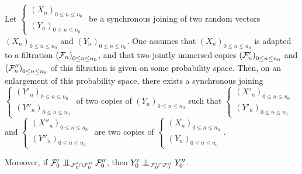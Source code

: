 \documentclass[12pt,a4paper]{article}
\begin{document}
\begin{lemma}\label{lemma:quadricoimm}
Let 
$\left\{\begin{smallmatrix} {(X_n)}_{0 \leq n \leq n_0} \\ 
{(Y_n)}_{0 \leq n \leq n_0}
\end{smallmatrix}\right.$  
be a synchronous joining of two random vectors 
${(X_n)}_{0 \leq n \leq n_0}$ and ${(Y_n)}_{0 \leq n \leq n_0}$. 
One assumes that ${(X_n)}_{0 \leq n \leq n_0}$ 
is adapted to a filtration ${(\mathcal{F}_n)}_{0 \leq n \leq n_0}$, 
and that two jointly immersed copies ${(\mathcal{F}'_n)}_{0 \leq n \leq n_0}$ 
and ${(\mathcal{F}''_n)}_{0 \leq n \leq n_0}$ of this filtration 
is given on some probability space.
Then, on an enlargement of this probability space, there 
exists a synchronous joining 
$\left\{\begin{smallmatrix} {(Y'_n)}_{0 \leq n \leq n_0} \\ 
{(Y''_n)}_{0 \leq n \leq n_0}
\end{smallmatrix}\right.$
of two copies of ${(Y_n)}_{0 \leq n \leq n_0}$ 
such that  
$\left\{\begin{smallmatrix} {(X'_n)}_{0 \leq n \leq n_0} \\ 
{(Y'_n)}_{0 \leq n \leq n_0}
\end{smallmatrix}\right.$ and 
$\left\{\begin{smallmatrix} {(X''_n)}_{0 \leq n \leq n_0} \\ 
{(Y''_n)}_{0 \leq n \leq n_0}
\end{smallmatrix}\right.$
are two copies of 
$\left\{\begin{smallmatrix} {(X_n)}_{0 \leq n \leq n_0} \\ 
{(Y_n)}_{0 \leq n \leq n_0}
\end{smallmatrix}\right.$.

Moreover, if $\FF'_0 \indep_{\FF'_0\cap\FF''_0} \FF''_0$, then 
 $Y'_0 \indep_{\FF'_0\cap\FF''_0} Y''_0$.
\end{lemma}
\end{document}
